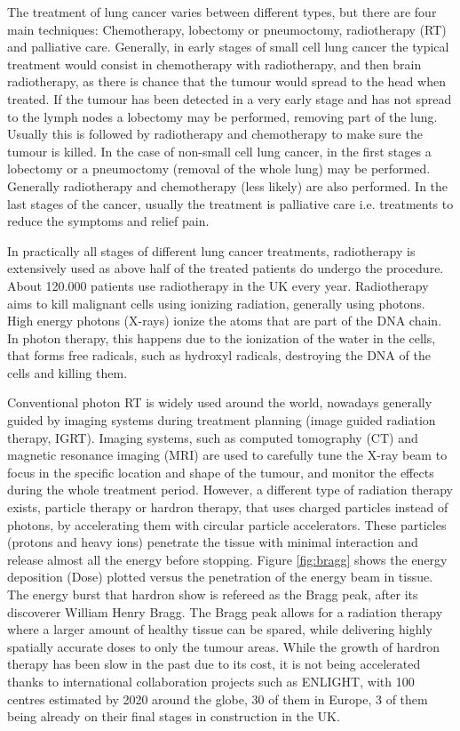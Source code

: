The treatment of lung cancer varies between different types, but there are four main techniques: Chemotherapy, lobectomy or pneumoctomy, radiotherapy (RT) and palliative care. Generally, in early stages of small cell lung cancer the typical treatment would consist in chemotherapy with radiotherapy, and then brain radiotherapy, as there is chance that the tumour would spread to the head when treated. If the tumour has been detected in a very early stage and has not spread to the lymph nodes a lobectomy may be performed, removing part of the lung. Usually this is followed by radiotherapy and chemotherapy to make sure the tumour is killed.
In the case of non-small cell lung cancer, in the first stages a lobectomy or a pneumoctomy (removal of the whole lung) may be performed. Generally radiotherapy and chemotherapy (less likely) are also performed. In the last stages of the cancer, usually the treatment is palliative care i.e. treatments to reduce the symptoms and relief pain\cite{CRUK2014b}.

In practically all stages of different lung cancer treatments, radiotherapy is extensively used as above half of the treated patients do undergo the procedure\cite{Cancerorg}. About 120.000 patients use radiotherapy in the UK every year. Radiotherapy aims to kill malignant cells using ionizing radiation, generally using photons. High energy photons (X-rays) ionize the atoms that are part of the DNA chain. In photon therapy, this happens due to the ionization of the water in the cells, that forms free radicals, such as hydroxyl radicals, destroying the DNA of the cells and killing them.

Conventional photon RT is widely used around the world, nowadays generally guided by imaging systems during treatment planning (image guided radiation therapy, IGRT). Imaging systems, such as computed tomography (CT) and magnetic resonance imaging (MRI) are used to carefully tune the X-ray beam to focus in the specific location and shape of the tumour, and monitor the effects during the whole treatment period. However, a different type of radiation therapy exists, particle therapy or hardron therapy, that uses charged particles instead of photons, by accelerating them with circular particle accelerators. These particles (protons and heavy ions)  penetrate the tissue with minimal interaction and release almost all the energy before stopping. Figure \ref{fig:bragg} shows the energy deposition (Dose) plotted versus the penetration of the energy beam in tissue. The energy burst that hardron show is refereed as the Bragg peak, after its discoverer William Henry Bragg. The Bragg peak allows for a radiation therapy where a larger amount of healthy tissue can be spared, while delivering highly spatially accurate doses to only the tumour areas. While the growth of hardron therapy has been slow in the past due to its cost, it is not being accelerated thanks to international collaboration projects such as ENLIGHT\cite{dosanjhparticle}, with 100 centres estimated by 2020 around the globe, 30 of them in Europe, 3 of them being already on their final stages in construction in the UK.

